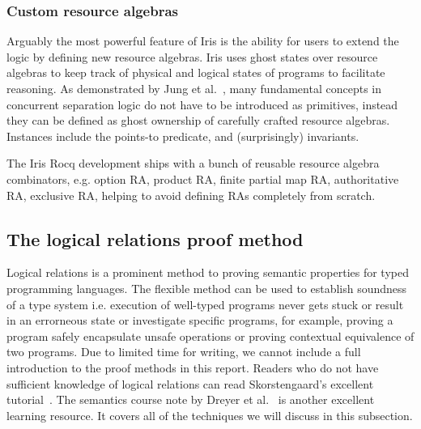 \documentclass{article}
\theoremstyle{definition}
\theoremstyle{plain}
\theoremstyle{remark}
\begin{document}
\subsubsection{Custom resource algebras}
Arguably the most powerful feature of Iris is the ability for users to extend the logic by defining new resource algebras.
Iris uses ghost states over resource algebras to keep track of physical and logical states of programs to facilitate reasoning.
As demonstrated by Jung et al.~\cite{iris3}, many fundamental concepts in concurrent separation logic do not have to be introduced as primitives,
instead they can be defined as ghost ownership of carefully crafted resource algebras.
Instances include the points-to predicate, and (surprisingly) invariants.
The Iris Rocq development ships with a bunch of reusable resource algebra combinators, e.g. option RA, product RA, finite partial map RA, authoritative RA, exclusive RA, helping to avoid defining RAs completely from scratch.


\subsection{The logical relations proof method}

Logical relations is a prominent method to proving semantic properties for typed programming languages.
The flexible method can be used to establish soundness of a type system i.e. execution of well-typed programs never gets stuck or result in an errorneous state or investigate specific programs, for example, proving a program safely encapsulate unsafe operations or proving contextual equivalence of two programs.
Due to limited time for writing, we cannot include a full introduction to the proof methods in this report.
Readers who do not have sufficient knowledge of logical relations can read Skorstengaard's excellent tutorial~\cite{skorstengaard2019logical}. The semantics course note by Dreyer et al.~\cite{dreyer2022semantics} is another excellent learning resource. It covers all of the techniques we will discuss in this subsection.
\end{document}
